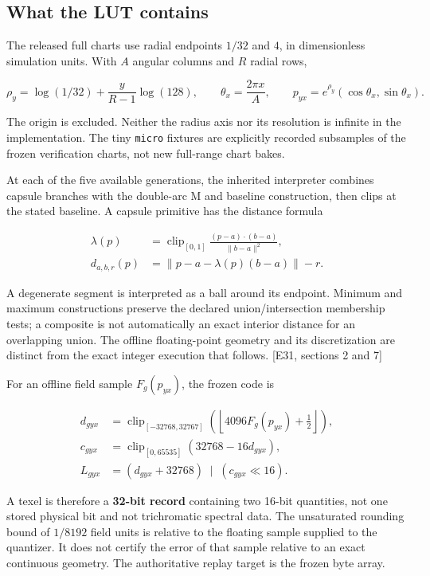 \documentclass[11pt,a4paper]{article}
\begin{document}
\subsection{What the LUT contains}\label{what-the-lut-contains}

The released full charts use radial endpoints \(1/32\) and \(4\), in
dimensionless simulation units. With \(A\) angular columns and \(R\)
radial rows,

\[
\rho_y=\log(1/32)+\frac{y}{R-1}\log(128),\qquad
\theta_x=\frac{2\pi x}{A},\qquad
p_{yx}=e^{\rho_y}(\cos\theta_x,\sin\theta_x).
\]

The origin is excluded. Neither the radius axis nor its resolution is
infinite in the implementation. The tiny \texttt{micro} fixtures are
explicitly recorded subsamples of the frozen verification charts, not
new full-range chart bakes.

At each of the five available generations, the inherited interpreter
combines capsule branches with the double-arc M and baseline
construction, then clips at the stated baseline. A capsule primitive has
the distance formula

\[
\begin{aligned}
\lambda(p)&=\operatorname{clip}_{[0,1]}
  \frac{(p-a)\cdot(b-a)}{\|b-a\|^2},\\
d_{a,b,r}(p)&=\|p-a-\lambda(p)(b-a)\|-r.
\end{aligned}
\]

A degenerate segment is interpreted as a ball around its endpoint.
Minimum and maximum constructions preserve the declared
union/intersection membership tests; a composite is not automatically an
exact interior distance for an overlapping union. The offline
floating-point geometry and its discretization are distinct from the
exact integer execution that follows. {[}E31, sections 2 and 7{]}

For an offline field sample \(F_g(p_{yx})\), the frozen code is

\[
\begin{aligned}
d_{gyx}&=\operatorname{clip}_{[-32768,32767]}
 \left(\left\lfloor4096F_g(p_{yx})+\tfrac12\right\rfloor\right),\\
c_{gyx}&=\operatorname{clip}_{[0,65535]}(32768-16d_{gyx}),\\
L_{gyx}&=(d_{gyx}+32768)\;\mathbin{|}\;(c_{gyx}\ll16).
\end{aligned}
\]

A texel is therefore a \textbf{32-bit record} containing two 16-bit
quantities, not one stored physical bit and not trichromatic spectral
data. The unsaturated rounding bound of \(1/8192\) field units is
relative to the floating sample supplied to the quantizer. It does not
certify the error of that sample relative to an exact continuous
geometry. The authoritative replay target is the frozen byte array.
\end{document}
